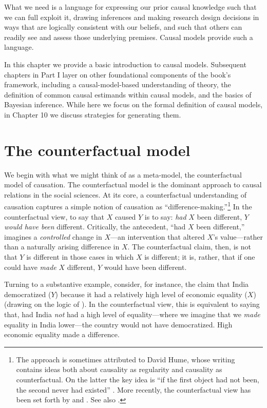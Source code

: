 \documentclass[
  12pt,
]{book}
\begin{document}
What we need is a language for expressing our prior causal knowledge such that we can full exploit it, drawing inferences and making research design decisions in ways that are logically consistent with our beliefs, and such that others can readily see and assess those underlying premises. Causal models provide such a language.

In this chapter we provide a basic introduction to causal models. Subsequent chapters in Part I layer on other foundational components of the book's framework, including a causal-model-based understanding of theory, the definition of common causal estimands within causal models, and the basics of Bayesian inference. While here we focus on the formal definition of causal models, in Chapter 10 we discuss strategies for generating them.

\hypertarget{the-counterfactual-model}{%
\section{The counterfactual model}\label{the-counterfactual-model}}

We begin with what we might think of as a meta-model, the counterfactual model of causation. The counterfactual model is the dominant approach to causal relations in the social sciences. At its core, a counterfactual understanding of causation captures a simple notion of causation as ``difference-making.''\footnote{The approach is sometimes attributed to David Hume, whose writing contains ideas both about causality as regularity and causality as counterfactual. On the latter the key idea is ``if the first object had not been, the second never had existed'' \citep[Section VIII]{hume2000enquiry}. More recently, the counterfactual view has been set forth by \citet{splawa1990application} and \citet{lewis1973counterfactuals}. See also \citet{lewis1986causation}.} In the counterfactual view, to say that \(X\) caused \(Y\) is to say: \emph{had} \(X\) been different, \(Y\) \emph{would have been} different. Critically, the antecedent, ``had \(X\) been different,'' imagines a \emph{controlled} change in \(X\)---an intervention that altered \(X\)'s value---rather than a naturally arising difference in \(X\). The counterfactual claim, then, is not that \(Y\) is different in those cases in which \(X\) is different; it is, rather, that if one could have \emph{made} \(X\) different, \(Y\) would have been different.

Turning to a substantive example, consider, for instance, the claim that India democratized (\(Y\)) because it had a relatively high level of economic equality (\(X\)) (drawing on the logic of \citet{boix2003democracy}). In the counterfactual view, this is equivalent to saying that, had India \emph{not} had a high level of equality---where we imagine that we \emph{made} equality in India lower---the country would not have democratized. High economic equality made a difference.
\end{document}
